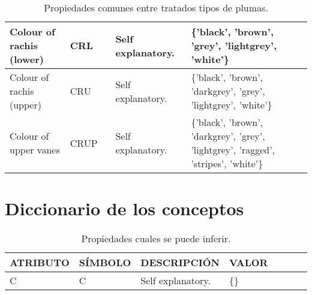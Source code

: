 \documentclass[a4paper,12pt]{article}
\begin{document}
\begin{table}[H]
\begin{tabular}{|p{0.2\linewidth}|p{0.15\linewidth}|p{0.25\linewidth}|p{0.4\linewidth}|}
		Colour of rachis (lower) & CRL     & Self explanatory.                             & \{'black', 'brown', 'grey', 'lightgrey', 'white'\}                                                                                     \\ \hline
		Colour of rachis (upper) & CRU     & Self explanatory.                             & \{'black', 'brown', 'darkgrey', 'grey', 'lightgrey', 'white'\}                                                                         \\ \hline
		Colour of upper vanes    & CRUP    & Self explanatory.                             & \{'black', 'brown', 'darkgrey', 'grey', 'lightgrey', 'ragged', 'stripes', 'white'\}                                                    \\ \hline
	\end{tabular}
	\caption{Propiedades comunes entre tratados tipos de plumas.}
\end{table}

\section{Diccionario de los conceptos}
\begin{table}[H]
	\centering
	\begin{tabular}{|p{0.2\linewidth}|p{0.15\linewidth}|p{0.25\linewidth}|p{0.4\linewidth}|}
		\hline
		ATRIBUTO & SÍMBOLO & DESCRIPCIÓN       & VALOR \\ \hline\hline
		C        & C       & Self explanatory. & \{\}  \\ \hline
	\end{tabular}
\caption{Propiedades cuales se puede inferir.}
\end{table}
\end{document}
